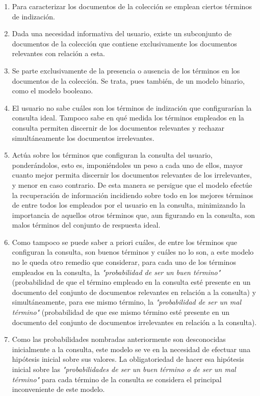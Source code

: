 \documentclass[titlepage]{article}
\begin{document}
\begin{enumerate}
	\item Para caracterizar los documentos de la colección se emplean ciertos términos de indización.
	
	\item Dada una necesidad informativa del usuario, existe un subconjunto de documentos de la colección que contiene exclusivamente los documentos relevantes con relación a esta.
	
	\item Se parte exclusivamente de la presencia o ausencia de los términos en los documentos de la colección. Se trata, pues también, de un modelo binario, como el modelo booleano.
	
	\item El usuario no sabe cuáles son los términos de indización que configurarían la consulta ideal. Tampoco sabe en qué medida los términos empleados en la consulta permiten discernir de los documentos relevantes y rechazar simultáneamente los documentos irrelevantes.
	
	\item Actúa sobre los términos que configuran la consulta del usuario, ponderándolos, esto es, imponiéndoles un peso a cada uno de ellos, mayor cuanto mejor permita discernir los documentos relevantes de los irrelevantes, y menor en caso contrario. De esta manera se persigue que el modelo efectúe la recuperación de información incidiendo sobre todo en los mejores términos de entre todos los empleados por el usuario en la consulta, minimizando la importancia de aquellos otros términos que, aun figurando en la consulta, son malos términos del conjunto de respuesta ideal.
	
	\item Como tampoco se puede saber a priori cuáles, de entre los términos que configuran la consulta, son buenos términos y cuáles no lo son, a este modelo no le queda otro remedio que considerar, para cada uno de los términos empleados en la consulta, la \textit{"probabilidad de ser un buen término"} (probabilidad de que el término empleado en la consulta esté presente en un documento del conjunto de documentos relevantes en relación a la consulta) y simultáneamente, para ese mismo término, la \textit{"probabilidad de ser un mal término"} (probabilidad de que ese mismo término esté presente en un documento del conjunto de documentos irrelevantes en relación a la consulta).
	
	\newpage
	\item Como las probabilidades nombradas anteriormente son desconocidas inicialmente a la consulta, este modelo se ve en la necesidad de efectuar una hipótesis inicial sobre sus valores. La obligatoriedad de hacer esa hipótesis inicial sobre las \textit{"probabilidades de ser un buen término o de ser un mal término"} para cada término de la consulta se considera el principal inconveniente de este modelo. 
\end{enumerate}
\end{document}
